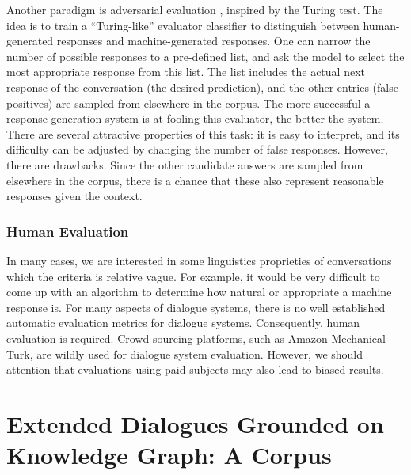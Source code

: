 \documentclass[bsc,frontabs,twoside,singlespacing,parskip,deptreport]{infthesis}     %
\begin{document}
Another paradigm is adversarial evaluation \cite{bowman2015generating,kannan2017adversarial,li2017adversarial}, inspired by the Turing test. The idea is to train a “Turing-like” evaluator classifier to distinguish between human-generated responses and machine-generated responses. One can narrow the number of possible responses to a pre-defined list, and ask the model to select the most appropriate response from this list. The list includes the actual next response of the conversation (the desired prediction), and the other entries (false positives) are sampled from elsewhere in the corpus. The more successful a response generation system is at fooling this evaluator, the better the system. There are several attractive properties of this task: it is easy to interpret, and its difficulty can be adjusted by changing the number of false responses. However, there are drawbacks. Since the other candidate answers are sampled from elsewhere in the corpus, there is a chance that these also represent reasonable responses given the context. 

\subsection{Human Evaluation}

In many cases, we are interested in some linguistics proprieties of conversations which the criteria is relative vague. For example, it would be very difficult to come up with an algorithm to determine how natural or appropriate a machine response is. For many aspects of dialogue systems, there is no well established automatic evaluation metrics for dialogue systems. Consequently, human evaluation is required. Crowd-sourcing platforms, such as Amazon Mechanical Turk\cite{mturk}, are wildly used for dialogue system evaluation. However, we should attention that evaluations using paid subjects may also lead to biased results\cite{young2013pomdp}.









\chapter{Extended Dialogues Grounded on Knowledge Graph: A Corpus}
\end{document}
